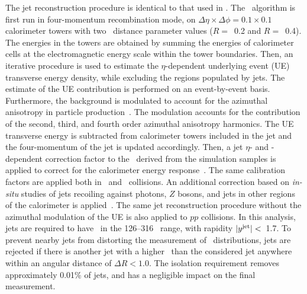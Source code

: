 
The jet reconstruction procedure is identical to that used in \cite{2019108}. 
The \antikt\ algorithm is first run in four-momentum recombination mode, on
$\Delta \eta \times \Delta \phi = 0.1\times 0.1$  calorimeter towers with two \antikt\ distance parameter values ($R=$~0.2 and $R=$~0.4). The energies in the towers are obtained by summing the
	energies of calorimeter cells at the electromagnetic energy scale within the tower boundaries. Then,
	  an iterative procedure is used to estimate the $\eta$-dependent underlying event (UE)  transverse energy density, while excluding the regions populated by jets. The estimate of the UE contribution is performed on an event-by-event basis.
	Furthermore, the background is modulated to account for the azimuthal anisotropy in particle production~\cite{ATLAS:2012at}. The modulation accounts for the contribution of the second, third, and fourth order azimuthal anisotropy harmonics.
	The UE transverse energy is subtracted from calorimeter towers included in the jet and the four-momentum of the jet is updated accordingly.
	  Then, a jet $\eta$- and \pT-dependent  correction factor to the \ptjet\ 
	  derived from the simulation samples is applied to correct for the calorimeter energy
	  response~\cite{Aaboud:2017jcu}. The same calibration factors are applied both 
in \pp\ and \pbpb\ collisions.
An additional correction based on \textit{in-situ} studies of jets recoiling against photons, $Z$ bosons, and jets in other regions of the calorimeter is
	  applied~\cite{ATL-PHYS-PUB-2015-036,2019167}. The same jet reconstruction procedure without the
	  azimuthal modulation of the UE is also applied to $pp$ collisions.
	  In this analysis, jets are required to have \ptjet\ in the 126--316 \GeV\ range, with rapidity  $|\mbox{$y^{\mathrm{jet}}$}|<$~1.7. 
 To prevent nearby jets from distorting the measurement of \Dptr\ distributions, 
jets are rejected if there is another jet with a higher \ptjet\ than the considered jet anywhere
within an angular distance of $\Delta R < 1.0$. The isolation requirement removes approximately 0.01\% of jets, and has a negligible impact on the final measurement.

